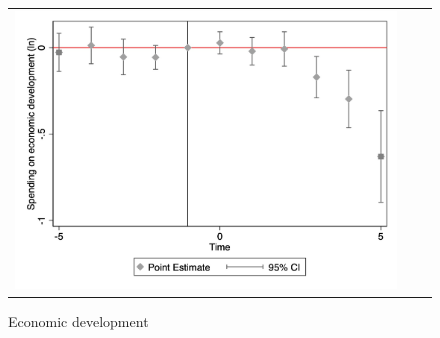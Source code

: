 \begin{figure}[ht]
\begin{tabular}{@{}ccc@{}}
\begin{minipage}[t]{0.32\textwidth}
            \caption{Economic development}
            \includegraphics[width=\linewidth]{images/total population/caseventdd_ln_q4_11_step1.jpg}
            \label{fig:casecodev}
        \end{minipage} \\[10pt]


\end{tabular}
\end{figure}
